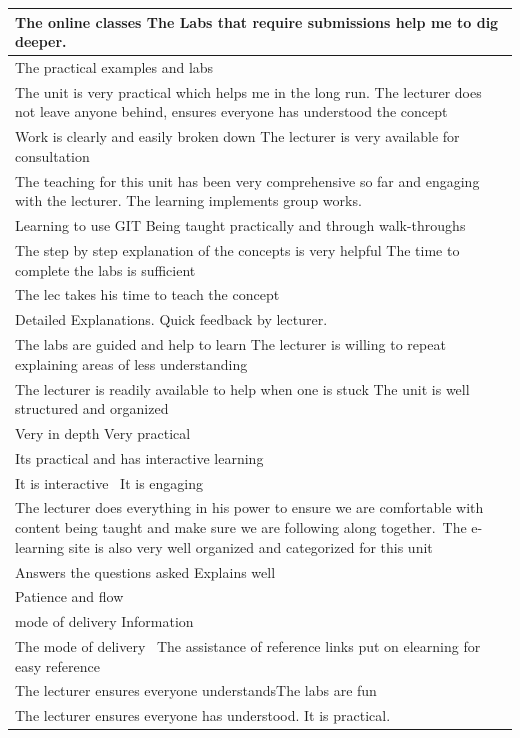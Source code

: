 \documentclass[
]{article}
\begin{document}
\begin{longtable}[t]{>{\raggedright\arraybackslash}p{35em}}
\hline
The online classes  The Labs that require submissions help me to dig deeper.\\
\hline
The practical examples and labs\\
\hline
The unit is very practical which helps me in the long run.  The lecturer does not leave anyone behind, ensures everyone has understood the concept\\
\hline
Work is clearly and easily broken down  The lecturer is very available for consultation\\
\hline
The teaching for this unit has been very comprehensive so far and engaging with the lecturer.  The learning implements group works.\\
\hline
Learning to use GIT  Being taught practically and through walk-throughs\\
\hline
The step by step explanation of the concepts is very helpful  The time to complete the labs is sufficient \\
\hline
The lec takes his time to teach the concept\\
\hline
Detailed Explanations.  Quick feedback by lecturer.\\
\hline
The labs are guided and help to learn  The lecturer is willing to repeat explaining areas of less understanding\\
\hline
The lecturer is readily available to help when one is stuck  The unit is well structured and organized\\
\hline
Very in depth  Very practical\\
\hline
Its practical and has interactive learning \\
\hline
It is interactive   It is engaging\\
\hline
The lecturer does everything in his power to ensure we are comfortable with content being taught and make sure we are following along together. The e-learning site is also very well organized and categorized for this unit\\
\hline
Answers the questions asked  Explains well\\
\hline
Patience and flow\\
\hline
mode of delivery  Information\\
\hline
The mode of delivery   The assistance of reference links put on elearning for easy reference \\
\hline
The lecturer ensures everyone understandsThe labs are fun\\
\hline
The lecturer ensures everyone has understood.  It is practical.\\

\end{longtable}
\end{document}
